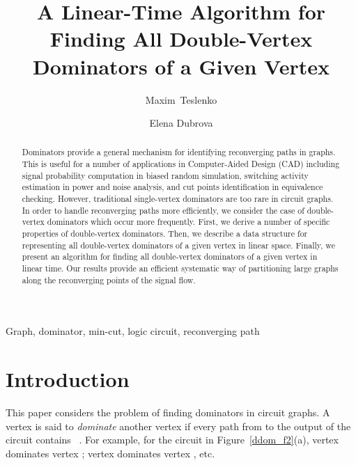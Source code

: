 \documentclass{llncs}
\newenvironment{keywords}{
       \list{}{\advance\topsep by0.35cm\relax\small
       \leftmargin=1cm
       \labelwidth=0.35cm
       \listparindent=0.35cm
       \itemindent\listparindent
       \rightmargin\leftmargin}\item[\hskip\labelsep
                                     \bfseries Keywords:]}
     {\endlist}
\begin{document}
\thispagestyle{plain}
\pagestyle{plain}  

\title{A Linear-Time Algorithm for Finding All Double-Vertex Dominators of a Given Vertex}
\author{Maxim~Teslenko \and Elena Dubrova}

\maketitle
 
\begin{abstract}

Dominators provide a general mechanism for identifying reconverging paths in graphs. This is useful for a number of applications in Computer-Aided Design (CAD) including signal probability computation in biased random simulation, switching activity estimation in power and noise analysis, and cut points identification in equivalence checking. However, traditional single-vertex dominators are too rare in circuit graphs. In order to handle reconverging paths more efficiently, we consider the case of double-vertex dominators which occur more frequently. First, we derive a number of specific properties of double-vertex dominators. Then, we describe a data structure for representing all double-vertex dominators of a given vertex in linear space. Finally, we present an algorithm for finding all double-vertex dominators of a given vertex in linear time. Our results provide an efficient systematic way of partitioning large graphs along the reconverging points of the signal flow.
\end{abstract} 

\begin{keywords} 
Graph, dominator, min-cut, logic circuit, reconverging path
\end{keywords} 
\section{Introduction}
\label{ddom_sec:introduction}

This paper considers the problem of finding dominators in circuit graphs. 
A vertex  is said to {\em dominate} another vertex  if every path
from  to the output of the circuit contains ~\cite{LeT79}.  
For example, for the circuit in Figure~\ref{ddom_f2}(a), vertex 
dominates vertex ; vertex  dominates vertex , etc.
\end{document}
